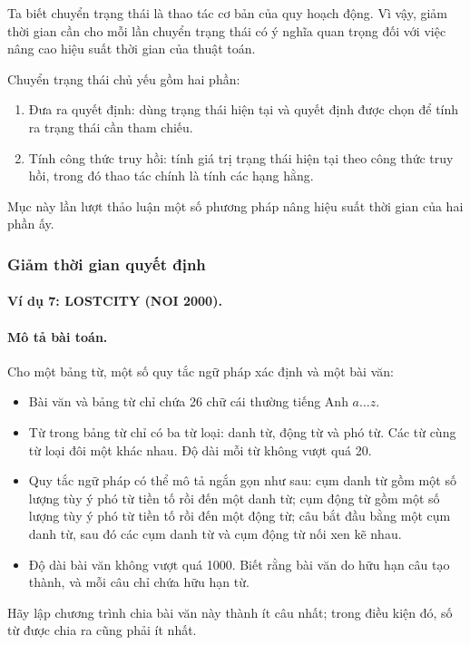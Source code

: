 \documentclass[11pt]{article}
\begin{document}
Ta biết chuyển trạng thái là thao tác cơ bản của quy hoạch động. Vì vậy, giảm
thời gian cần cho mỗi lần chuyển trạng thái có ý nghĩa quan trọng đối với
việc nâng cao hiệu suất thời gian của thuật toán.

Chuyển trạng thái chủ yếu gồm hai phần:
\begin{enumerate}
  \item Đưa ra quyết định: dùng trạng thái hiện tại và quyết định được chọn
  để tính ra trạng thái cần tham chiếu.
  \item Tính công thức truy hồi: tính giá trị trạng thái hiện tại theo công
  thức truy hồi, trong đó thao tác chính là tính các hạng hằng.
\end{enumerate}
Mục này lần lượt thảo luận một số phương pháp nâng hiệu suất thời gian của
hai phần ấy.

\subsubsection{Giảm thời gian quyết định}

\paragraph{Ví dụ 7: LOSTCITY (NOI 2000).}

\paragraph{Mô tả bài toán.}
Cho một bảng từ, một số quy tắc ngữ pháp xác định và một bài văn:
\begin{itemize}
  \item Bài văn và bảng từ chỉ chứa 26 chữ cái thường tiếng Anh \(a\ldots z\).
  \item Từ trong bảng từ chỉ có ba từ loại: danh từ, động từ và phó từ. Các
  từ cùng từ loại đôi một khác nhau. Độ dài mỗi từ không vượt quá 20.
  \item Quy tắc ngữ pháp có thể mô tả ngắn gọn như sau: cụm danh từ gồm một
  số lượng tùy ý phó từ tiền tố rồi đến một danh từ; cụm động từ gồm một số
  lượng tùy ý phó từ tiền tố rồi đến một động từ; câu bắt đầu bằng một cụm
  danh từ, sau đó các cụm danh từ và cụm động từ nối xen kẽ nhau.
  \item Độ dài bài văn không vượt quá 1000. Biết rằng bài văn do hữu hạn câu
  tạo thành, và mỗi câu chỉ chứa hữu hạn từ.
\end{itemize}
Hãy lập chương trình chia bài văn này thành ít câu nhất; trong điều kiện đó,
số từ được chia ra cũng phải ít nhất.
\end{document}
